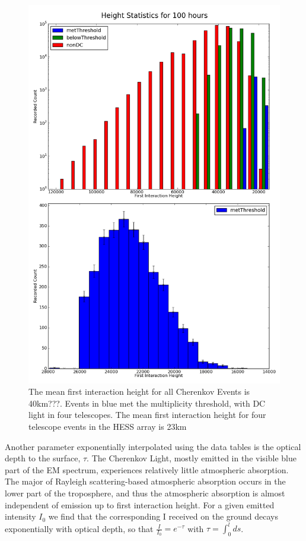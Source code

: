 \documentclass[11pt]{article}
\begin{document}
\begin{figure}
\begin{center}
\includegraphics[height=0.9\textheight]{hessheight}
\caption{The mean first interaction height for all Cherenkov Events is 40km???. Events in blue met the multiplicity threshold, with DC light in four telescopes. The mean first interaction height for four telescope events in the HESS array is 23km}
\label{fig:Hessheight}
\end{center}
\end{figure}

Another parameter exponentially interpolated using the data tables is the optical depth to the surface, $\tau$. The Cherenkov Light, mostly emitted in the visible blue part of the EM spectrum, experiences relatively little atmospheric absorption. The major of Rayleigh scattering-based atmospheric absorption occurs in the lower part of the troposphere, and thus the atmospheric absorption is almost independent of emission up to first interaction height. For a given emitted intensity $I_{0}$ we find that the corresponding I received on the ground decays exponentially with optical depth, so that $\frac{I}{I_{0}}=e^{-\tau}$ with $\tau=\int_{0}^{l}ds$. 
\end{document}
